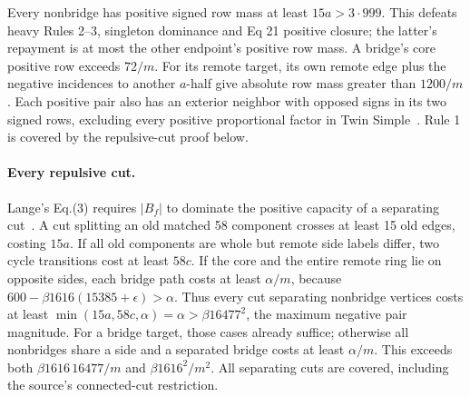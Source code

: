 \documentclass[sigconf,anonymous,review]{acmart}
\newcommand{\1}{\mathbf{1}}
\begin{document}
Every nonbridge has positive signed row mass at least $15a>3\cdot999$.
This defeats heavy Rules 2--3, singleton dominance and Eq 21 positive
closure; the latter's repayment is at most the other endpoint's
positive row mass. A bridge's core positive row exceeds $72/m$.
For its remote target, its own remote edge plus the negative incidences
to another $a$-half give absolute row mass greater than $1200/m$.
Each positive pair also has an exterior neighbor with opposed signs
in its two signed rows, excluding every positive proportional factor
in Twin Simple~\cite{blasius2022branch}. Rule 1 is covered by the
repulsive-cut proof below.

\paragraph{Every repulsive cut.}
Lange's Eq.(3) requires $|B_f|$ to dominate the positive capacity of
a separating cut~\cite{lange2019combinatorial}.
A cut splitting an old matched 58 component crosses at least 15 old
edges, costing $15a$. If all old components are whole but remote side
labels differ, two cycle transitions cost at least $58c$.
If the core and the entire remote ring lie on opposite sides, each
bridge path costs at least $\alpha/m$, because
$600-\beta1616(15385+\epsilon)>\alpha$.
Thus every cut separating nonbridge vertices costs at least
$\min(15a,58c,\alpha)=\alpha>\beta16477^2$, the maximum negative
pair magnitude. For a bridge target, those cases already suffice;
otherwise all nonbridges share a side and a separated bridge costs
at least $\alpha/m$. This exceeds both
$\beta1616\,16477/m$ and $\beta1616^2/m^2$.
All separating cuts are covered, including the source's connected-cut
restriction.
\end{document}
